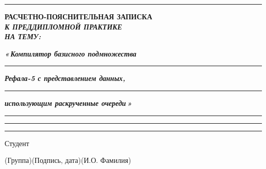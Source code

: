 \documentclass[14pt, russian]{scrartcl}
\begin{document}
\begin{titlepage}
\vspace*{-16pt}
\hspace{25pt}\rule{0.875\textwidth}{0.4pt}

\vspace{3em}

\begin{center}
\Large \bf{РАСЧЕТНО-ПОЯСНИТЕЛЬНАЯ ЗАПИСКА\\\textbf{\textit{К ПРЕДДИПЛОМНОЙ ПРАКТИКЕ\\НА ТЕМУ:}} \\}
\end{center}

\vspace*{-6ex}
\begin{center}
\Large
\textit{\textbf{«\,Компилятор базисного подмножества}}\par
\vspace*{-3ex}
\rule{0.9\textwidth}{1.2pt}

\vspace*{0.55ex}
\textit{\textbf{Рефала-5 с представлением данных,}}\par
\vspace*{-3ex}
\rule{0.9\textwidth}{1.2pt}

\vspace*{0.55ex}
\textit{\textbf{использующим раскрученные очереди\,»}}\par
\vspace*{-3ex}
\rule{0.9\textwidth}{1.2pt}

\vspace*{-0.2ex}
\rule{0.9\textwidth}{1.2pt}

\vspace*{-0.2ex}
\rule{0.9\textwidth}{1.2pt}
\end{center}

\vspace{\fill}

\newlength{\ML}

\noindent Студент \underline{\hspace{1.5cm}} \hfill \underline{\hspace{4cm}}\quad
\underline{\hspace{4cm}}

\vspace{-2.1ex}
\noindent\hspace{9ex}\scriptsize{(Группа)}\normalsize\hspace{170pt}\hspace{2ex}\scriptsize{(Подпись, дата)}\normalsize\hspace{30pt}\hspace{6ex}\scriptsize{(И.О. Фамилия)}\normalsize


\end{titlepage}
\end{document}
